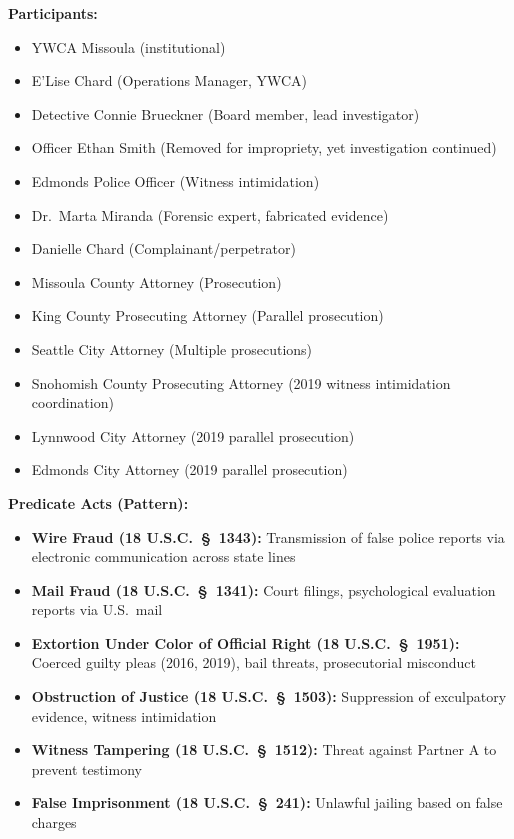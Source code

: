 \documentclass[11pt, letterpaper]{article}
\begin{document}
\textbf{Participants:}
\begin{itemize}[leftmargin=*,itemsep=2pt]
    \item YWCA Missoula (institutional)
    \item E'Lise Chard (Operations Manager, YWCA)
    \item Detective Connie Brueckner (Board member, lead investigator)
    \item Officer Ethan Smith (Removed for impropriety, yet investigation continued)
    \item Edmonds Police Officer (Witness intimidation)
    \item Dr.\ Marta Miranda (Forensic expert, fabricated evidence)
    \item Danielle Chard (Complainant/perpetrator)
    \item Missoula County Attorney (Prosecution)
    \item King County Prosecuting Attorney (Parallel prosecution)
    \item Seattle City Attorney (Multiple prosecutions)
    \item Snohomish County Prosecuting Attorney (2019 witness intimidation coordination)
    \item Lynnwood City Attorney (2019 parallel prosecution)
    \item Edmonds City Attorney (2019 parallel prosecution)
\end{itemize}

\textbf{Predicate Acts (Pattern):}
\begin{itemize}[leftmargin=*,itemsep=2pt]
    \item \textbf{Wire Fraud (18 U.S.C.\ \S\ 1343):} Transmission of false police reports via electronic communication across state lines
    \item \textbf{Mail Fraud (18 U.S.C.\ \S\ 1341):} Court filings, psychological evaluation reports via U.S.\ mail
    \item \textbf{Extortion Under Color of Official Right (18 U.S.C.\ \S\ 1951):} Coerced guilty pleas (2016, 2019), bail threats, prosecutorial misconduct
    \item \textbf{Obstruction of Justice (18 U.S.C.\ \S\ 1503):} Suppression of exculpatory evidence, witness intimidation
    \item \textbf{Witness Tampering (18 U.S.C.\ \S\ 1512):} Threat against Partner A to prevent testimony
    \item \textbf{False Imprisonment (18 U.S.C.\ \S\ 241):} Unlawful jailing based on false charges
\end{itemize}
\end{document}

